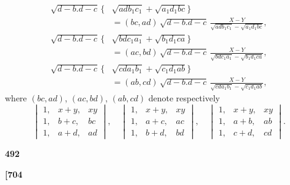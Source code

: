 \documentclass[11pt,a4paper]{book}
\begin{document}
\begin{align*}
\sqrt{d - b . d - c}\, \{&\sqrt{adb_1 c_1} + \sqrt{a_1 d_1 bc}\} \\
&= (bc, ad)\, \sqrt{d - b . d - c}\, \frac{X - Y}{\sqrt{adb_1 c_1} - \sqrt{a_1 d_1 bc}}, \\
\sqrt{d - b . d - c}\, \{&\sqrt{bdc_1 a_1} + \sqrt{b_1 d_1 ca}\} \\
&= (ac, bd)\, \sqrt{d - b . d - c}\, \frac{X - Y}{\sqrt{bdc_1 a_1} - \sqrt{b_1 d_1 ca}}, \\
\sqrt{d - b . d - c}\, \{&\sqrt{cda_1 b_1} + \sqrt{c_1 d_1 ab}\} \\
&= (ab, cd)\, \sqrt{d - b . d - c}\, \frac{X - Y}{\sqrt{cda_1 b_1} - \sqrt{c_1 d_1 ab}},
\end{align*}
where $(bc, ad)$, $(ac, bd)$, $(ab, cd)$ denote respectively
\[
\begin{vmatrix}
1, & x + y, & xy \\
1, & b + c, & bc \\
1, & a + d, & ad
\end{vmatrix},\quad
\begin{vmatrix}
1, & x + y, & xy \\
1, & a + c, & ac \\
1, & b + d, & bd
\end{vmatrix},\quad
\begin{vmatrix}
1, & x + y, & xy \\
1, & a + b, & ab \\
1, & c + d, & cd
\end{vmatrix}.
\]

\vspace{1em}

\begin{center}
\textbf{492}
\end{center}

\vspace{0.5em}

\noindent\textbf{[704}

\vspace{0.5em}
\end{document}
